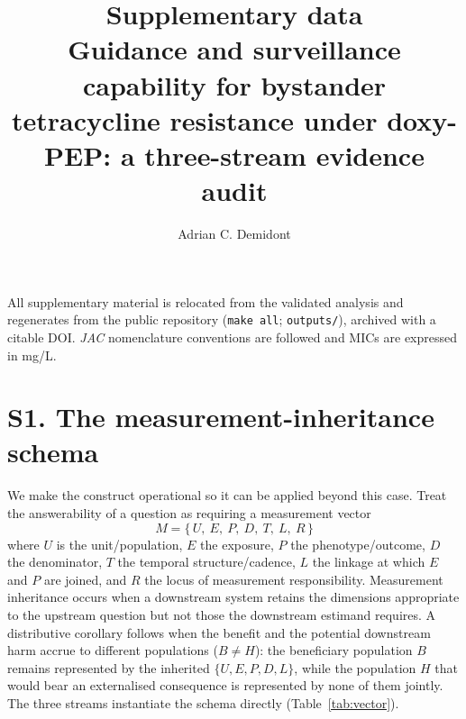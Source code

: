 \documentclass[11pt,a4paper]{article}
\title{\textbf{Supplementary data}\\[6pt]
\large Guidance and surveillance capability for bystander \Sa{} tetracycline
resistance under doxy-PEP: a three-stream evidence audit}
\author{Adrian C. Demidont}
\date{}
\begin{document}
\maketitle
\thispagestyle{empty}

\noindent All supplementary material is relocated from the validated analysis and
regenerates from the public repository (\texttt{make all}; \texttt{outputs/}),
archived with a citable DOI. \textit{JAC} nomenclature conventions are followed
and MICs are expressed in mg/L.

\section*{S1. The measurement-inheritance schema}

We make the construct operational so it can be applied beyond this case. Treat the
answerability of a question as requiring a measurement vector
\[M=\{\,U,\ E,\ P,\ D,\ T,\ L,\ R\,\}\]
where $U$ is the unit/population, $E$ the exposure, $P$ the phenotype/outcome, $D$
the denominator, $T$ the temporal structure/cadence, $L$ the linkage at which $E$
and $P$ are joined, and $R$ the locus of measurement responsibility. Measurement
inheritance occurs when a downstream system retains the dimensions appropriate to
the upstream question but not those the downstream estimand requires. A
distributive corollary follows when the benefit and the potential downstream harm
accrue to different populations ($B\neq H$): the beneficiary population $B$ remains
represented by the inherited $\{U,E,P,D,L\}$, while the population $H$ that would
bear an externalised consequence is represented by none of them jointly. The three
streams instantiate the schema directly (Table~\ref{tab:vector}).
\end{document}
